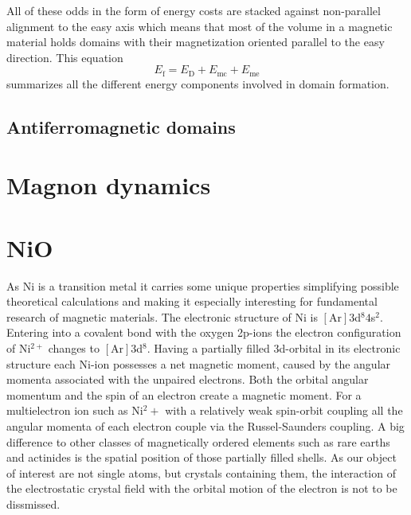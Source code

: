 All of these odds in the form of energy costs are stacked against non-parallel alignment to the easy axis which means that most of the volume in a magnetic material holds domains with their magnetization oriented parallel to the easy direction.
This equation
\begin{equation}
    E_{\text{f}} = E_{\text{D}} + E_{\text{mc}} + E_{\text{me}}
    \label{eqn:landau_lifschitz_energy}
\end{equation}
summarizes all the different energy components involved in domain formation.

\subsection{Antiferromagnetic domains}

\section{Magnon dynamics} 


\section{NiO}
As Ni is a transition metal it carries some unique properties simplifying possible theoretical calculations and making it especially interesting for fundamental research of magnetic materials.
The electronic structure of Ni is $[\text{Ar}]3$d$^8 4$s$^2$.
Entering into a covalent bond with the oxygen 2p-ions the electron configuration of Ni$^{2+}$ changes to $[\text{Ar}]3$d$^8$.
Having a partially filled 3d-orbital in its electronic structure each Ni-ion possesses a net magnetic moment, caused by the angular momenta associated with the unpaired electrons.
Both the orbital angular momentum and the spin of an electron create a magnetic moment.
For a multielectron ion such as Ni$^2+$ with a relatively weak spin-orbit coupling all the angular momenta of each electron couple via the Russel-Saunders coupling.
A big difference to other classes of magnetically ordered elements such as rare earths and actinides is the spatial position of those partially filled shells.
As our object of interest are not single atoms, but crystals containing them, the interaction of the electrostatic crystal field with the orbital motion of the electron is not to be dissmissed.

